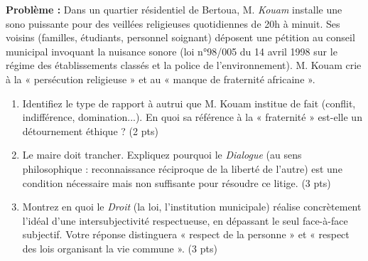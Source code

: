 \documentclass[11pt]{article}
\begin{document}
\begin{exercice}
    \textbf{Problème :} Dans un quartier résidentiel de Bertoua, M. \textit{Kouam} installe une sono puissante pour des veillées religieuses quotidiennes de 20h à minuit. Ses voisins (familles, étudiants, personnel soignant) déposent une pétition au conseil municipal invoquant la nuisance sonore (loi n°98/005 du 14 avril 1998 sur le régime des établissements classés et la police de l'environnement). M. Kouam crie à la « persécution religieuse » et au « manque de fraternité africaine ».
    \begin{enumerate}
        \item Identifiez le type de rapport à autrui que M. Kouam institue de fait (conflit, indifférence, domination...). En quoi sa référence à la « fraternité » est-elle un détournement éthique ? (2 pts)
        \item Le maire doit trancher. Expliquez pourquoi le \textit{Dialogue} (au sens philosophique : reconnaissance réciproque de la liberté de l'autre) est une condition nécessaire mais non suffisante pour résoudre ce litige. (3 pts)
        \item Montrez en quoi le \textit{Droit} (la loi, l'institution municipale) réalise concrètement l'idéal d'une intersubjectivité respectueuse, en dépassant le seul face-à-face subjectif. Votre réponse distinguera « respect de la personne » et « respect des lois organisant la vie commune ». (3 pts)
    \end{enumerate}
\end{exercice}
\end{document}
